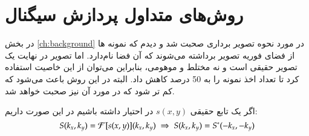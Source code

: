 \section{روش‌های متداول پردازش سیگنال}
در بخش \ref{ch:background} در مورد نحوه تصویر برداری \mri صحبت شد و دیدم که نمونه ها از فضای فوریه تصویر برداشته می‌شوند که آن فضا \kspace نام‌دارد. اما تصویر در نهایت یک تصویر حقیقی است و نه مختلط و موهومی، بنابراین می‌توان از این خاصیت استفاده کرد تا تعداد اخذ نمونه را به 50 درصد کاهش داد. البته در این روش باعث می‌شود که  کم تر شود که در مورد آن نیز صحبت خواهد شد.

\begin{قضیه}
اگر یک تابع حقیقی $s(x,y)$ در احتیار داشته باشیم در این صورت داریم:
$$S(k_x, k_y) = \mathcal{F}[s(x,y)](k_x, k_y) \; \Rightarrow \; S(k_x, k_y) = S^*(-k_x,-k_y) $$
\end{قضیه}
























